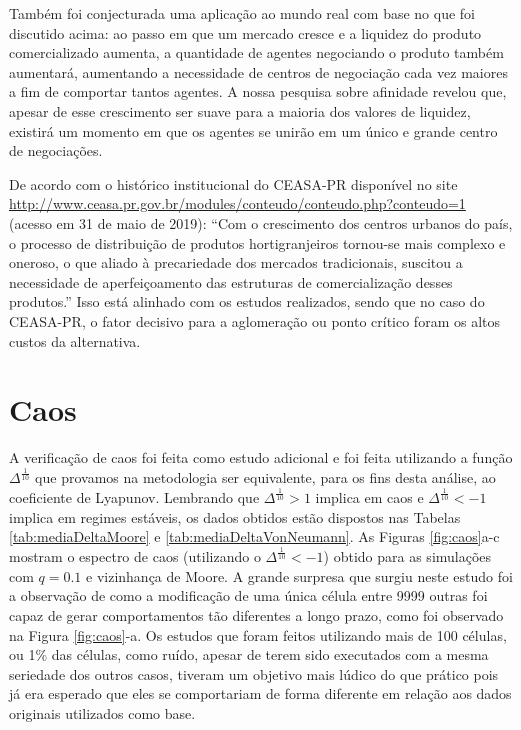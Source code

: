 \documentclass[
	12pt,				%
	openright,			%
	twoside,			%
	a4paper,			%
	english,			%
	french,				%
	spanish,			%
	brazil				%
	]{abntex2}
\begin{document}
Também foi conjecturada uma aplicação ao mundo real com base no que foi discutido acima: ao passo em que um mercado cresce e a liquidez do produto comercializado aumenta, a quantidade de agentes negociando o produto também aumentará, aumentando a necessidade de centros de negociação cada vez maiores a fim de comportar tantos agentes. A nossa pesquisa sobre afinidade revelou que, apesar de esse crescimento ser suave para a maioria dos valores de liquidez, existirá um momento em que os agentes se unirão em um único e grande centro de negociações. 

De acordo com o histórico institucional do CEASA-PR disponível no site \url{http://www.ceasa.pr.gov.br/modules/conteudo/conteudo.php?conteudo=1} (acesso em 31 de maio de 2019): ``Com o crescimento dos centros urbanos do país, o processo de distribuição de produtos hortigranjeiros tornou-se mais complexo e oneroso, o que aliado à precariedade dos mercados tradicionais, suscitou a necessidade de aperfeiçoamento das estruturas de comercialização desses produtos.'' Isso está alinhado com os estudos realizados, sendo que no caso do CEASA-PR, o fator decisivo para a aglomeração ou ponto crítico foram os altos custos da alternativa. 

\section{Caos}

A verificação de caos foi feita como estudo adicional e foi feita utilizando a função $\Delta^\frac{1}{10}$ que provamos na metodologia ser equivalente, para os fins desta análise, ao coeficiente de Lyapunov. Lembrando que $\Delta^\frac{1}{10}>1$ implica em caos e $\Delta^\frac{1}{10}<-1$ implica em regimes estáveis, os dados obtidos estão dispostos nas Tabelas \ref{tab:mediaDeltaMoore} e \ref{tab:mediaDeltaVonNeumann}. As Figuras \ref{fig:caos}a-c mostram o espectro de caos (utilizando o $\Delta^\frac{1}{10}<-1$) obtido para as simulações com $q=0.1$ e vizinhança de Moore. A grande surpresa que surgiu neste estudo foi a observação de como a modificação de uma única célula entre 9999 outras foi capaz de gerar comportamentos tão diferentes a longo prazo, como foi observado na Figura \ref{fig:caos}-a. Os estudos que foram feitos utilizando mais de 100 células, ou 1\% das células, como ruído, apesar de terem sido executados com a mesma seriedade dos outros casos, tiveram um objetivo mais lúdico do que prático pois já era esperado que eles se comportariam de forma diferente em relação aos dados originais utilizados como base.
\end{document}
